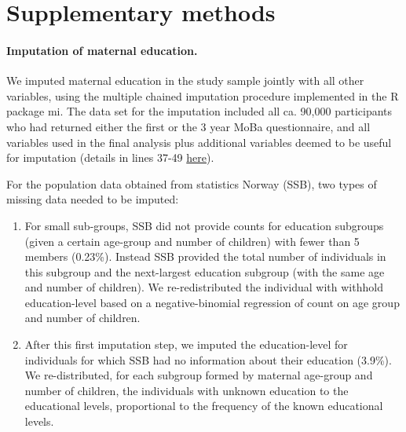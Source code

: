 \documentclass[12pt]{article}
\begin{document}
\tableofcontents

\section{Supplementary methods}

\paragraph{Imputation of maternal education.} We imputed maternal education in the study sample jointly with all other variables, using the multiple chained imputation procedure implemented in the R package mi. The data set for the imputation included all ca. 90,000 participants who had returned  either the first or the 3 year MoBa questionnaire, and all variables used in the final analysis plus additional variables deemed to be useful for imputation (details in lines 37-49 \href{https://github.com/gbiele/IPW/blob/master/AnalysisBIPW/021\_mi\_utils.R}{here}).

For the population data obtained from statistics Norway (SSB), two types of missing data needed to be imputed: 
\begin{enumerate}
	\item For small sub-groups, SSB did not provide counts for education subgroups (given a certain age-group and number of children) with fewer than 5 members (0.23\%). Instead SSB provided the total number of individuals in this subgroup and the next-largest education subgroup (with the same age and number of children). We re-redistributed the individual with withhold education-level based on a negative-binomial regression of count on age group and number of children.
	\item After this first imputation step, we imputed the education-level for individuals for which SSB had no information about their education (3.9\%). We re-distributed, for each subgroup formed by maternal age-group and number of children, the individuals with unknown education to the educational levels, proportional to the frequency of the known educational levels. 
\end{enumerate}
\end{document}
